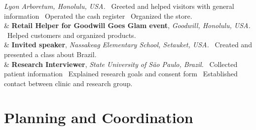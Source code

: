 \documentclass[11pt, a4paper]{article}
\newcommand{\Year}[1]{\fontsize{10pt}{0}\selectfont #1}
\begin{document}
\begin{EntriesTable}
	\newline
	\textit{Lyon Arboretum, Honolulu, USA.}
	\newline
	\textbullet \ Greeted and helped visitors with general information
	\textbullet \ Operated the cash register
	\textbullet \ Organized the store.
	\\
	\Year{2018}  &
	\textbf{Retail Helper for Goodwill Goes Glam event},
	\newline
	\textit{Goodwill, Honolulu, USA.}
	\newline
	\textbullet \ Helped customers and organized products.
	\\
	\Year{2017}  &
	\textbf{Invited speaker},
	\newline
	\textit{Nassakeag Elementary School, Setauket, USA.}
	\newline
	\textbullet \ Created and presented a class about Brazil.
	\\
	\Year{2009}  &
	\textbf{Research Interviewer},
	\newline
	\textit{State University of São Paulo, Brazil.}
	\newline
	\textbullet \ Collected patient information
	\textbullet \ Explained research goals and consent form
	\textbullet \ Established contact between clinic and research group.
	\\

\end{EntriesTable}

\section*{Planning and Coordination}
\end{document}

